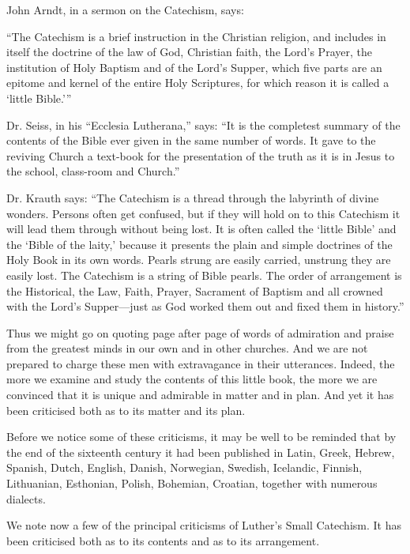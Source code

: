 John Arndt, in a sermon on the Catechism, says:

“The Catechism is a brief instruction in the Christian religion, and includes in itself the doctrine of
the law of God, Christian faith, the Lord’s Prayer, the institution of Holy Baptism and of the Lord’s Supper, which five parts are an epitome and kernel of the entire Holy Scriptures, for which reason it is called a ‘little Bible.’”

Dr. Seiss, in his “Ecclesia Lutherana,” says: “It is the completest summary of the contents of the Bible ever given in the same number of words. It gave to the reviving Church a text-book for the presentation of the truth as it is in Jesus to the school, class-room and Church.”

Dr. Krauth says: “The Catechism is a thread through the labyrinth of divine wonders. Persons often get confused, but if they will hold on to this Catechism it will lead them through without being lost. It is often called the ‘little Bible’ and the ‘Bible of the laity,’ because it presents the plain and simple doctrines of the Holy Book in its own words. Pearls strung are easily carried, unstrung they are easily lost. The Catechism is a string of Bible pearls. The order of arrangement is the Historical, the Law, Faith, Prayer, Sacrament of Baptism and all crowned with the Lord’s Supper—just as God worked them out and fixed them in history.”

Thus we might go on quoting page after page of words of admiration and praise from the greatest minds in our own and in other churches. And we are not prepared to charge these men with extravagance
in their utterances. Indeed, the more we examine and study the contents of this little book, the more we are convinced that it is unique and admirable in matter and in plan. And yet it has been criticised both as to its matter and its plan.

 Before we notice some of these criticisms, it may be well to be reminded that by the end of the sixteenth century it had been published in Latin, Greek, Hebrew, Spanish, Dutch, English, Danish, Norwegian, Swedish, Icelandic, Finnish, Lithuanian, Esthonian, Polish, Bohemian, Croatian, together with numerous dialects.

We note now a few of the principal criticisms of Luther’s Small Catechism. It has been criticised both as to its contents and as to its arrangement.

